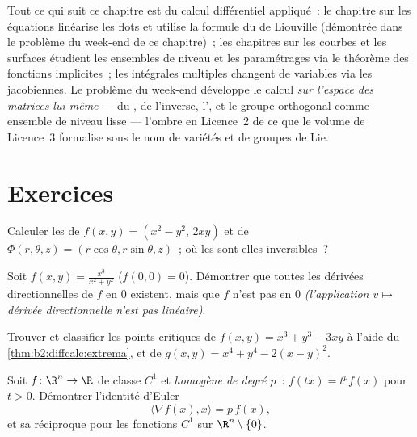 \begin{remark}
Tout ce qui suit ce chapitre est du calcul différentiel appliqué~: le
chapitre sur les équations  linéarise les flots et
utilise la formule du  de Liouville (démontrée dans le
problème du week-end de ce chapitre)~; les chapitres sur les courbes
et les surfaces étudient les ensembles de niveau et les paramétrages
via le théorème des fonctions implicites~; les intégrales multiples
changent de variables via les jacobiennes. Le problème du week-end
développe le calcul \emph{sur l'espace des matrices lui-même} ---
 du , de l'inverse, l', et le groupe orthogonal comme ensemble de niveau lisse ---
l'ombre en Licence~2 de ce que le volume de Licence~3 formalise sous
le nom de variétés et de groupes de Lie.
\end{remark}

\section{Exercices}

\begin{exercise}[$\star$]\label{exo:b2:diffcalc:1}
Calculer les  de $f(x,y) = (x^2 - y^2,\, 2xy)$ et
de $\Phi(r,\theta,z) = (r\cos\theta, r\sin\theta, z)$~; où les
 sont-elles inversibles~?
\end{exercise}

\begin{exercise}[$\star$]\label{exo:b2:diffcalc:2}
Soit $f(x,y) = \frac{x^3}{x^2 + y^2}$ ($f(0,0) = 0$). Démontrer que
toutes les dérivées directionnelles de $f$ en $0$ existent, mais que
$f$ n'est pas  en $0$ \emph{(l'application $v \mapsto$
dérivée directionnelle n'est pas linéaire)}.
\end{exercise}

\begin{exercise}[$\star$]\label{exo:b2:diffcalc:3}
Trouver et classifier les points critiques de $f(x, y) = x^3 + y^3 -
3xy$ à l'aide du \cref{thm:b2:diffcalc:extrema}, et de $g(x,y) = x^4 +
y^4 - 2(x - y)^2$.
\end{exercise}

\begin{exercise}[$\star\star$]\label{exo:b2:diffcalc:4}
Soit $f \colon \R^n \to \R$ de classe $C^1$ et \emph{homogène de degré
$p$}~: $f(tx) = t^pf(x)$ pour $t > 0$. Démontrer l'identité d'Euler
\[
\langle \nabla f(x), x\rangle = p\,f(x) ,
\]
et sa réciproque pour les fonctions $C^1$ sur $\R^n\setminus\{0\}$.
\end{exercise}

